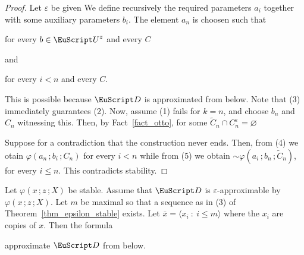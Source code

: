 \begin{proof}
Let $\varepsilon$ be given
  We define recursively the required parameters $a_i$ together with some auxiliary parameters $b_i$.
The element $a_n$ is choosen such that

\hfill for every $b\in{\EuScript U}^z$ and every $C$

and

\hfill for every $i<n$ and every $C$.\smallskip

This is possible because ${\EuScript D}$ is approximated from below.
Note that (3) immediately guarantees (2).
Now, assume (1) fails for $k=n$, and choose $b_n$ and $C_n$ witnessing this.
Then, by Fact~\ref{fact_otto}, for some $\tilde C_n\cap C_n^\varepsilon=\varnothing$


Suppose for a contradiction that the construction never ends.
Then, from (4) we otain $\varphi(a_n\,;b_i\,;C_n)$ for every $i<n$ while from (5) we obtain ${\sim}\varphi(a_i\,;b_n\,;\tilde C_n)$, for every $i\le n$.
This contradicts stability.
\end{proof}

\begin{lemma}
  Let $\varphi(x\,;z\,;X)$ be stable.
  Assume that ${\EuScript D}$ is $\varepsilon$-approximable by $\varphi(x\,;z\,;X)$.
  Let $m$ be maximal so that a sequence as in (3) of Theorem~\ref{thm_epsilon_stable} exists.
  Let $\bar x=\langle x_i\ :\ i\le m\rangle$ where the $x_i$ are copies of $x$.
  Then the formula\smallskip

  \smallskip

  approximate ${\EuScript D}$ from below.
\end{lemma}


